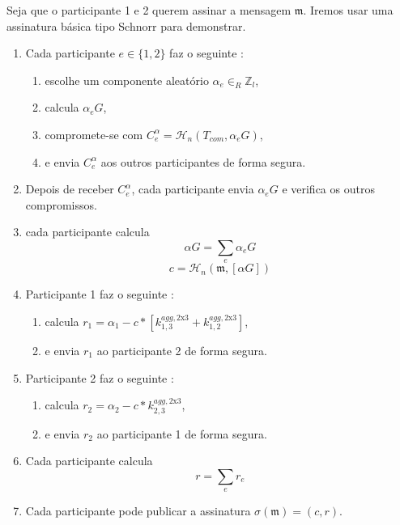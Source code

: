 Seja que o participante 1 e 2 querem assinar a mensagem $\mathfrak{m}$. Iremos usar uma assinatura básica tipo Schnorr para demonstrar. 
\begin{enumerate}
    \item Cada participante $e \in \{1,2\}$ faz o seguinte :
    \begin{enumerate}
        \item escolhe um componente aleatório $\alpha_e \in_R \mathbb{Z}_l$,
        \item calcula $\alpha_e G$,
        \item compromete-se com $C^{\alpha}_{e} = \mathcal{H}_n(T_{com},\alpha_e G)$,
        \item e envia $C^{\alpha}_{e}$ aos outros participantes de forma segura.
    \end{enumerate}
    \item Depois de receber $C^{\alpha}_{e}$, cada participante envia $\alpha_e G$ e verifica os outros compromissos.
    \item cada participante calcula 
    \[\alpha G = \sum_e \alpha_e G\]
    \[c = \mathcal{H}_n(\mathfrak{m},[\alpha G])\]
    \item Participante 1 faz o seguinte :
    \begin{enumerate}
        \item calcula $r_1 = \alpha_1 - c*[k^{agg,\textrm{2x3}}_{1,3} + k^{agg,\textrm{2x3}}_{1,2}]$,
        \item e envia $r_1$ ao participante 2 de forma segura.
    \end{enumerate}
    \item Participante 2 faz o seguinte :
    \begin{enumerate}
        \item calcula $r_2 = \alpha_2 - c*k^{agg,\textrm{2x3}}_{2,3}$,
        \item e envia $r_2$ ao participante 1 de forma segura.
    \end{enumerate}
    \item Cada participante calcula
    \[r = \sum_e r_e\]
    \item Cada participante pode publicar a assinatura $\sigma(\mathfrak{m}) = (c,r)$.
\end{enumerate}

